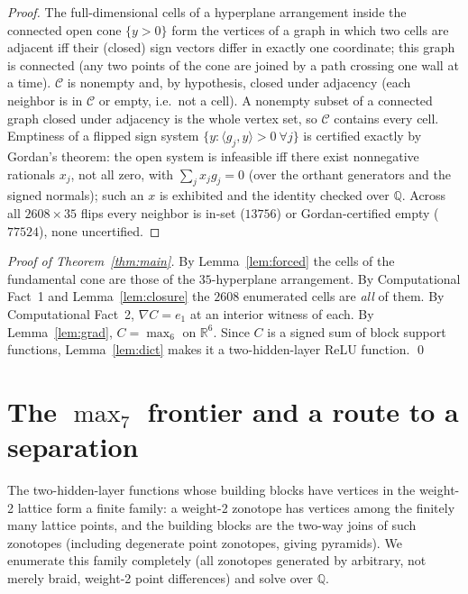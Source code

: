 \documentclass[11pt]{article}
\theoremstyle{definition}
\newcommand{\RR}{\mathbb{R}}
\begin{document}
\begin{proof}
The full-dimensional cells of a hyperplane arrangement inside the connected open cone $\{y>0\}$ form the
vertices of a graph in which two cells are adjacent iff their (closed) sign vectors differ in exactly one
coordinate; this graph is connected (any two points of the cone are joined by a path crossing one wall at a
time). $\mathcal{C}$ is nonempty and, by hypothesis, closed under adjacency (each neighbor is in
$\mathcal{C}$ or empty, i.e.\ not a cell). A nonempty subset of a connected graph closed under adjacency is
the whole vertex set, so $\mathcal{C}$ contains every cell. Emptiness of a flipped sign system
$\{y:\langle g_j,y\rangle>0\ \forall j\}$ is certified exactly by Gordan's theorem: the open system is
infeasible iff there exist nonnegative rationals $x_j$, not all zero, with $\sum_j x_j g_j=0$ (over the
orthant generators and the signed normals); such an $x$ is exhibited and the identity checked over
$\mathbb{Q}$. Across all $2608\times 35$ flips every neighbor is in-set ($13756$) or Gordan-certified empty
($77524$), none uncertified.
\end{proof}

\begin{proof}[Proof of Theorem~\ref{thm:main}]
By Lemma~\ref{lem:forced} the cells of the fundamental cone are those of the $35$-hyperplane arrangement.
By Computational Fact~1 and Lemma~\ref{lem:closure} the $2608$ enumerated cells are \emph{all} of them.
By Computational Fact~2, $\nabla C=e_1$ at an interior witness of each. By Lemma~\ref{lem:grad}, $C=\max_6$
on $\RR^6$. Since $C$ is a signed sum of block support functions, Lemma~\ref{lem:dict} makes it a
two-hidden-layer ReLU function. \qed
\end{proof}

\section{The $\max_7$ frontier and a route to a separation}

The two-hidden-layer functions whose building blocks have vertices in the weight-2 lattice form a finite
family: a weight-2 zonotope has vertices among the finitely many lattice points, and the building blocks
are the two-way joins of such zonotopes (including degenerate point zonotopes, giving pyramids). We
enumerate this family completely (all zonotopes generated by arbitrary, not merely braid, weight-2 point
differences) and solve over $\mathbb{Q}$.
\end{document}
